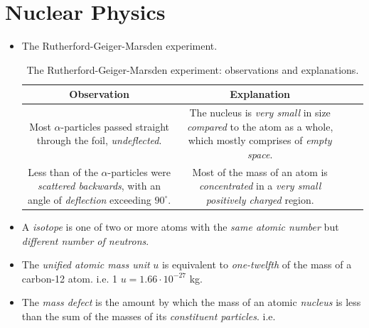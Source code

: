 \documentclass[oneside]{book}
\begin{document}
\chapter{Nuclear Physics}
\begin{itemize}
    \item The Rutherford-Geiger-Marsden experiment.
    \begin{table}[H]
        \centering
        \begin{tabular}{ScSc}
            \toprule
            Observation & Explanation\\
            \midrule
            \begin{minipage}{0.5\textwidth-25.2pt}
                Most \(\alpha\)-particles passed straight through the foil, \emph{undeflected}.
            \end{minipage}& 
            \begin{minipage}{0.5\textwidth-25.2pt}
                The nucleus is \emph{very small} in size \emph{compared} to the atom as a whole, which mostly comprises of \emph{empty space}.
            \end{minipage}\\
            \midrule
            \begin{minipage}{0.5\textwidth-25.2pt}
                Less than  of the \(\alpha\)-particles were \emph{scattered backwards}, with an angle of \emph{deflection} exceeding \(90^\circ\).
            \end{minipage}& 
            \begin{minipage}{0.5\textwidth-25.2pt}
                Most of the mass of an atom is \emph{concentrated} in a \emph{very small positively charged} region.
            \end{minipage}\\
            \bottomrule
        \end{tabular}
        \caption{The Rutherford-Geiger-Marsden experiment: observations and explanations.}
        \label{table:rutherford-geiger-marsden}
    \end{table}
    \item[\AsteriskThin] A \emph{isotope} is one of two or more atoms with the \emph{same atomic number} but \emph{different number of neutrons}.
    \item[\AsteriskThin] The \emph{unified atomic mass unit} \(u\) is equivalent to \emph{one-twelfth} of the mass of a carbon-12 atom. i.e. 1 \(u=1.66\cdot 10^{-27}\) kg.
    \item[\AsteriskThin] The \emph{mass defect} is the amount by which the mass of an atomic \emph{nucleus} is less than the sum of the masses of its \emph{constituent particles}. i.e.

\end{itemize}
\end{document}
